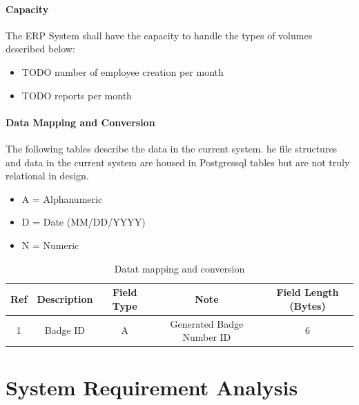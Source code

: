 \paragraph{Capacity}
The ERP System shall have the capacity to handle the types of volumes described below:
\begin{itemize}
	\item {TODO} number of employee creation per month
	\item {TODO} reports per month
\end{itemize}

\paragraph{Data Mapping and Conversion}
The following tables describe the data in the current system. he file structures and data in the current system are housed in Postgressql tables but are not truly relational in design.

\begin{itemize}
	\item A = Alphanumeric
	\item D = Date (MM/DD/YYYY)
	\item N = Numeric
\end{itemize}

\begin{center}
\begin{table}[!hb]
\begin{tabular}{|c|c|c|c|c| } 
  \hline
  \textbf{Ref} & \textbf{Description} & \textbf{Field Type} & \textbf{Note} & \textbf{Field Length (Bytes)} \\ 
  \hline
  1 & Badge ID & A & Generated Badge Number ID & 6 \\ 
  \hline
\end{tabular}
\caption{Datat mapping and conversion}
\end{table}
\end{center}


\section{System Requirement Analysis}

